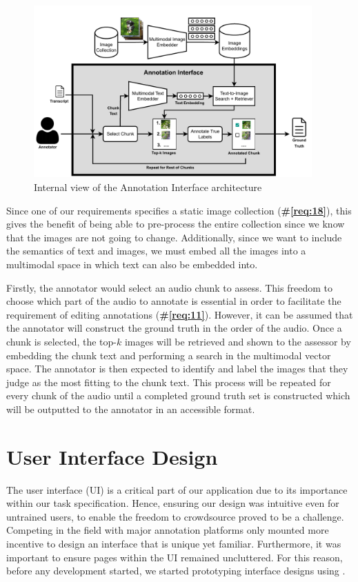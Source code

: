 \documentclass{l4proj}
\begin{document}
\begin{figure}[h]
    \centering
    \includegraphics[width=0.95\textwidth]{figures/annotation_interface.pdf}
    \caption{Internal view of the Annotation Interface architecture}
    \label{fig:annotation_interface}
\end{figure}

Since one of our requirements specifies a static image collection (\textbf{\#\ref{req:18}}), this gives the benefit of being able to pre-process the entire collection since we know that the images are not going to change. Additionally, since we want to include the semantics of text and images, we must embed all the images into a multimodal space in which text can also be embedded into.

Firstly, the annotator would select an audio chunk to assess. This freedom to choose which part of the audio to annotate is essential in order to facilitate the requirement of editing annotations (\textbf{\#\ref{req:11}}). However, it can be assumed that the annotator will construct the ground truth in the order of the audio. Once a chunk is selected, the top-$k$ images will be retrieved and shown to the assessor by embedding the chunk text and performing a search in the multimodal vector space. The annotator is then expected to identify and label the images that they judge as the most fitting to the chunk text. This process will be repeated for every chunk of the audio until a completed ground truth set is constructed which will be outputted to the annotator in an accessible format.


\section{User Interface Design}
The user interface (UI) is a critical part of our application due to its importance within our task specification. Hence, ensuring our design was intuitive even for untrained users, to enable the freedom to crowdsource proved to be a challenge. Competing in the field with major annotation platforms only mounted more incentive to design an interface that is unique yet familiar. Furthermore, it was important to ensure pages within the UI remained uncluttered. For this reason, before any development started, we started prototyping interface designs using \cite{figma}.
\end{document}
